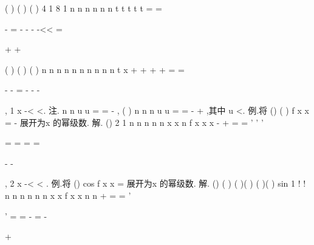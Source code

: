 (
)
(
)
(
)
4 1
8 1
n
n
n
n
n
n
t
t
t
t
t
\infty 
\infty 
=
=




\cdots 
-
\cdots 
=
-
-
-
-<<
=




+
+




\sum 
\sum 
(
)
(
)
(
)
n
n
n
n
n
n
n
n
n
n
t
x
\infty 
\infty 
+
+
+
+
=
=




-
-
=
-
-
-








\sum 
\sum 
, 1
x
-<
<. 
\textcolor{lyred}{注}.
n
n
u
u
\infty 
=
=
-
\sum 
,
(
)
n
n
n
u
u
\infty 
=
=
-
+
\sum 
,其中
u <. 
\textcolor{lyred}{例}.将
()
(
)
f x
x
=
-
展开为x 的幂级数. 
解.
()
2 1
n
n
n
n
n
x
x
n
f x
x
x
\infty 
\infty 
-
+
=
=
'
'
'








=
=
=
=










-
-










\sum 
\sum 
, 2
x
-<
<
. 
\textcolor{lyred}{例}.将
()
cos
f x
x
=
展开为x 的幂级数. 
解.
()
(
)
(
)(
)
(
)(
)
sin
1 !
!
n
n
n
n
n
n
x
x
f x
x
n
n
+
\infty 
\infty 
=
=
'


'
=
=
-
=
-


+


